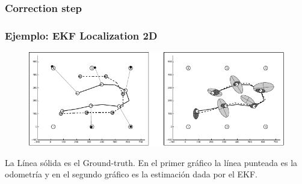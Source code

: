\begin{frame}
    \frametitle{Correction step}
    
       \begin{figure}[!h]
        \centering
    \end{figure}

\end{frame}

\begin{frame}
    \frametitle{Ejemplo: EKF Localization 2D}
    
    \begin{figure}[!h]
        \includegraphics[width=\columnwidth]{./images/ekf_localization_example.pdf}
    \end{figure}
    
    La Línea sólida es el Ground-truth. En el primer gráfico la línea punteada es la odometría y en el segundo gráfico es la estimación dada por el EKF.
    
\end{frame}

